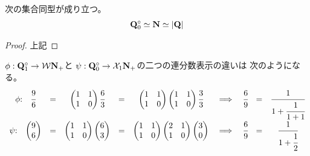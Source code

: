 	\begin{proposition}[自然数と有理数の集合同型]
	\label{prop:自然数と有理数の集合同型} %
		次の集合同型が成り立つ。
		\begin{equation*}\begin{split}
			\bunsub[0] \simeq \sizen \simeq |\bun|
		\end{split}\end{equation*}
	\end{proposition} %
	\begin{proof} 上記
	\end{proof}

	$\phi:\bunsub[1]\to\Word\sizen_+$と
	$\psi:\bunsub[0]\to\mycal{X}_1\sizen_+$の二つの連分数表示の違いは
	次のようになる。
	{\setlength\arraycolsep{2pt}
	\begin{equation*}\begin{array}{ccccccccccc}
		\phi $:\quad$
		\cfrac{9}{6} &=& \begin{pmatrix}
			1 & 1 \\
			1 & 0 \\
		\end{pmatrix} \cfrac{6}{3} &=& \begin{pmatrix}
			1 & 1 \\
			1 & 0 \\
		\end{pmatrix}\begin{pmatrix}
			1 & 1 \\
			1 & 0 \\
		\end{pmatrix} \cfrac{3}{3}
		&\implies& \cfrac{6}{9} &=& \cfrac{1}{1 + \cfrac{1}{1 + 1}} \\
		\psi $:\quad$
		\begin{pmatrix} 9 \\6 \end{pmatrix} &=& \begin{pmatrix}
			1 & 1 \\
			1 & 0 \\
		\end{pmatrix} \begin{pmatrix} 6 \\3 \end{pmatrix} &=& \begin{pmatrix}
			1 & 1 \\
			1 & 0 \\
		\end{pmatrix}\begin{pmatrix}
			2 & 1 \\
			1 & 0 \\
		\end{pmatrix} \begin{pmatrix} 3 \\0 \end{pmatrix}
		&\implies& \cfrac{6}{9} &=& \cfrac{1}{1 + \cfrac{1}{2}} \\
	\end{array}\end{equation*}
	}
